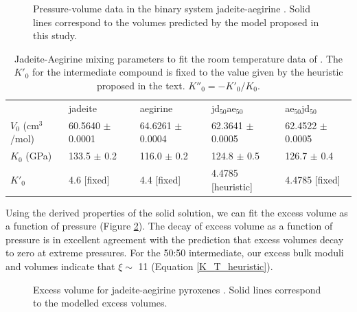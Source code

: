 \begin{figure}[ht!]
  \centering
  \caption{Pressure-volume data in the binary system jadeite-aegirine \citep{NBLBT2006}. Solid lines correspond to the volumes predicted by the model proposed in this study.}
  \label{fig:PV_jadeite_aegirine}
\end{figure}

\begin{table}[ht!]
\centering
\caption{Jadeite-Aegirine mixing parameters to fit the room temperature data of \cite{NBLBT2006}. The $K'_0$ for the intermediate compound is fixed to the value given by the heuristic proposed in the text. $K''_0 = -K'_0/K_0$.}
\label{tab:jd_aeg}
\begin{tabular}{lllll}
                   & jadeite              & aegirine             & jd$_{50}$ae$_{50}$             & ae$_{50}$jd$_{50}$             \\
$V_0$ (cm$^3$/mol) & 60.5640 $\pm$ 0.0001 & 64.6261 $\pm$ 0.0004 & 62.3641 $\pm$ 0.0005 & 62.4522 $\pm$ 0.0005 \\
$K_0$ (GPa)        & 133.5 $\pm$ 0.2      & 116.0 $\pm$ 0.2      & 124.8 $\pm$ 0.5      & 126.7 $\pm$ 0.4      \\
$K'_0$             & 4.6 [fixed]                 & 4.4 [fixed]                 & 4.4785 [heuristic]              & 4.4785  [fixed]           
\end{tabular}
\end{table}

Using the derived properties of the solid solution, we can fit the excess volume as a function of pressure (Figure \ref{fig:excess_volume_jadeite_aegirine}). The decay of excess volume as a function of pressure is in excellent agreement with the prediction that excess volumes decay to zero at extreme pressures. For the 50:50 intermediate, our excess bulk moduli and volumes indicate that $\xi \sim$ 11 (Equation \ref{K_T_heuristic}).

\begin{figure}[ht!]
  \centering
  \caption{Excess volume for jadeite-aegirine pyroxenes \citep{NBLBT2006}. Solid lines correspond to the modelled excess volumes.}
  \label{fig:excess_volume_jadeite_aegirine}
\end{figure}

